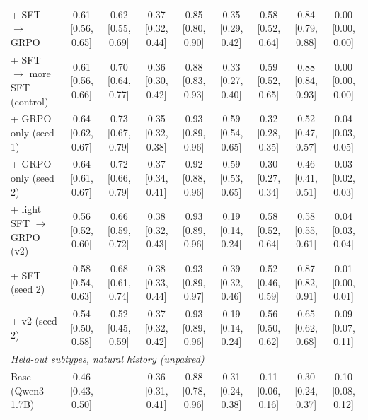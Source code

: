 \begin{tabular}{lcccccccc}
+ SFT $\to$ GRPO & 0.61 {\scriptsize [0.56, 0.65]} & 0.62 {\scriptsize [0.55, 0.69]} & 0.37 {\scriptsize [0.32, 0.44]} & 0.85 {\scriptsize [0.80, 0.90]} & 0.35 {\scriptsize [0.29, 0.42]} & 0.58 {\scriptsize [0.52, 0.64]} & 0.84 {\scriptsize [0.79, 0.88]} & 0.00 {\scriptsize [0.00, 0.00]} \\
+ SFT $\to$ more SFT (control) & 0.61 {\scriptsize [0.56, 0.66]} & 0.70 {\scriptsize [0.64, 0.77]} & 0.36 {\scriptsize [0.30, 0.42]} & 0.88 {\scriptsize [0.83, 0.93]} & 0.33 {\scriptsize [0.27, 0.40]} & 0.59 {\scriptsize [0.52, 0.65]} & 0.88 {\scriptsize [0.84, 0.93]} & 0.00 {\scriptsize [0.00, 0.00]} \\
+ GRPO only (seed 1) & 0.64 {\scriptsize [0.62, 0.67]} & 0.73 {\scriptsize [0.67, 0.79]} & 0.35 {\scriptsize [0.32, 0.38]} & 0.93 {\scriptsize [0.89, 0.96]} & 0.59 {\scriptsize [0.54, 0.65]} & 0.32 {\scriptsize [0.28, 0.35]} & 0.52 {\scriptsize [0.47, 0.57]} & 0.04 {\scriptsize [0.03, 0.05]} \\
+ GRPO only (seed 2) & 0.64 {\scriptsize [0.61, 0.67]} & 0.72 {\scriptsize [0.66, 0.79]} & 0.37 {\scriptsize [0.34, 0.41]} & 0.92 {\scriptsize [0.88, 0.96]} & 0.59 {\scriptsize [0.53, 0.65]} & 0.30 {\scriptsize [0.27, 0.34]} & 0.46 {\scriptsize [0.41, 0.51]} & 0.03 {\scriptsize [0.02, 0.03]} \\
+ light SFT $\to$ GRPO (v2) & 0.56 {\scriptsize [0.52, 0.60]} & 0.66 {\scriptsize [0.59, 0.72]} & 0.38 {\scriptsize [0.32, 0.43]} & 0.93 {\scriptsize [0.89, 0.96]} & 0.19 {\scriptsize [0.14, 0.24]} & 0.58 {\scriptsize [0.52, 0.64]} & 0.58 {\scriptsize [0.55, 0.61]} & 0.04 {\scriptsize [0.03, 0.04]} \\
+ SFT (seed 2) & 0.58 {\scriptsize [0.54, 0.63]} & 0.68 {\scriptsize [0.61, 0.74]} & 0.38 {\scriptsize [0.33, 0.44]} & 0.93 {\scriptsize [0.89, 0.97]} & 0.39 {\scriptsize [0.32, 0.46]} & 0.52 {\scriptsize [0.46, 0.59]} & 0.87 {\scriptsize [0.82, 0.91]} & 0.01 {\scriptsize [0.00, 0.01]} \\
+ v2 (seed 2) & 0.54 {\scriptsize [0.50, 0.58]} & 0.52 {\scriptsize [0.45, 0.59]} & 0.37 {\scriptsize [0.32, 0.42]} & 0.93 {\scriptsize [0.89, 0.96]} & 0.19 {\scriptsize [0.14, 0.24]} & 0.56 {\scriptsize [0.50, 0.62]} & 0.65 {\scriptsize [0.62, 0.68]} & 0.09 {\scriptsize [0.07, 0.11]} \\
\midrule
\multicolumn{9}{l}{\textit{Held-out subtypes, natural history (unpaired)}} \\
\midrule
Base (Qwen3-1.7B) & 0.46 {\scriptsize [0.43, 0.50]} & -- & 0.36 {\scriptsize [0.31, 0.41]} & 0.88 {\scriptsize [0.78, 0.96]} & 0.31 {\scriptsize [0.24, 0.38]} & 0.11 {\scriptsize [0.06, 0.16]} & 0.30 {\scriptsize [0.24, 0.37]} & 0.10 {\scriptsize [0.08, 0.12]} \\

\end{tabular}
